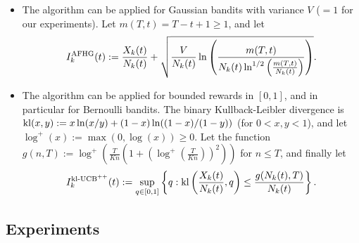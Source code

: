 \documentclass[12pt]{colt2018} %
\begin{document}
\begin{itemize}
    \item The algorithm \AFHG{} can be applied for Gaussian bandits with variance $V$ ($=1$ for our experiments).
    Let $m(T, t) = T - t + 1 \geq 1$, and let
    \begin{equation}\label{eq:index_AFHG}
        I_k^{\mathrm{AFHG}}(t) := \frac{X_k(t)}{N_k(t)} + \sqrt{\frac{V}{N_k(t)} \ln\left( \frac{m(T, t)}{N_k(t) \ln^{1/2}\left( \frac{m(T, t)}{N_k(t)} \right)} \right)}.
    \end{equation}

    \item The algorithm \KLUCBpp{} can be applied for bounded rewards in $[0,1]$, and in particular for Bernoulli bandits.
    The binary Kullback-Leibler divergence is $\mathrm{kl}(x,y) := x \ln(x/y) + (1-x) \ln((1-x)/(1-y))$ (for $0<x,y<1$),
    and let $\log^+(x) := \max(0, \log(x)) \geq 0$.
    Let the function $g(n, T) := \log^+\left(\frac{T}{K n} (1 + \left(\log^+(\frac{T}{K n})\right)^2)\right)$ for $n \leq T$,
    and finally let
    \begin{equation}\label{eq:index_KLUCBpp}
        I_k^{\mathrm{kl}\text{-}\mathrm{UCB}^{++}}(t) := \sup\limits_{q \in [0, 1]} \left\{ q : \mathrm{kl}\left(\frac{X_k(t)}{N_k(t)}, q\right) \leq \frac{g(N_k(t), T)}{N_k(t)} \right\}.
    \end{equation}
\end{itemize}




\subsection{Experiments}\label{sub:experiments}


\end{document}

